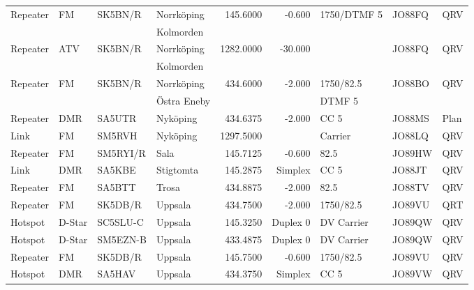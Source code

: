 \begin{landscape}
\begin{longtable}{llllrrlll}
Repeater & FM         & SK5BN/R  & Norrköping        & 145.6000     & -0.600     & 1750/DTMF 5     & JO88FQ      & QRV      \\
         &            &          & Kolmorden         &              &            &                 &             &          \\
Repeater & ATV        & SK5BN/R  & Norrköping        & 1282.0000    & -30.000    &                 & JO88FQ      & QRV      \\
         &            &          & Kolmorden         &              &            &                 &             &          \\
Repeater & FM         & SK5BN/R  & Norrköping        & 434.6000     & -2.000     & 1750/82.5       & JO88BO      & QRV      \\
         &            &          & Östra Eneby       &              &            & DTMF 5          &             &          \\
Repeater & DMR        & SA5UTR   & Nyköping          & 434.6375     & -2.000     & CC 5            & JO88MS      & Plan     \\
Link     & FM         & SM5RVH   & Nyköping          & 1297.5000    &            & Carrier         & JO88LQ      & QRV      \\
Repeater & FM         & SM5RYI/R & Sala              & 145.7125     & -0.600     & 82.5            & JO89HW      & QRV      \\
Link     & DMR        & SA5KBE   & Stigtomta         & 145.2875     & Simplex    & CC 5            & JO88JT      & QRV      \\
Repeater & FM         & SA5BTT   & Trosa             & 434.8875     & -2.000     & 82.5            & JO88TV      & QRV      \\
Repeater & FM         & SK5DB/R  & Uppsala           & 434.7500     & -2.000     & 1750/82.5       & JO89VU      & QRT      \\
Hotspot  & D-Star     & SC5SLU-C & Uppsala           & 145.3250     & Duplex 0   & DV Carrier      & JO89QW      & QRV      \\
Hotspot  & D-Star     & SM5EZN-B & Uppsala           & 433.4875     & Duplex 0   & DV Carrier      & JO89QW      & QRV      \\
Repeater & FM         & SK5DB/R  & Uppsala           & 145.7500     & -0.600     & 1750/82.5       & JO89VU      & QRV      \\
Hotspot  & DMR        & SA5HAV   & Uppsala           & 434.3750     & Simplex    & CC 5            & JO89VW      & QRV      \\

\end{longtable}
\end{landscape}
